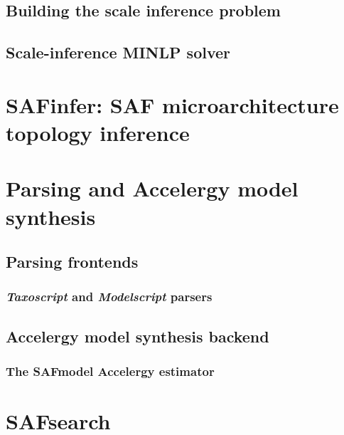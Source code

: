 \subsection{Building the scale inference problem}

\subsection{Scale-inference MINLP solver}

\section{SAFinfer: SAF microarchitecture topology inference}

\subsection{}

\section{Parsing and Accelergy model synthesis}

\subsection{Parsing frontends}

\subsubsection{\textit{Taxoscript} and \textit{Modelscript} parsers}

\subsection{Accelergy model synthesis backend}

\subsubsection{The SAFmodel Accelergy estimator}

\section{SAFsearch}